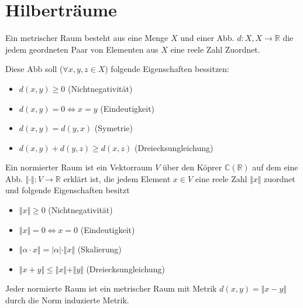 \section{Hilberträume}

\begin{Def}
	Ein metrischer Raum besteht aus eine Menge $X$ und einer Abb. $d: X,X\rightarrow \mathbb{R}$
	die jedem geordneten Paar von Elementen aus $X$ eine reele Zahl Zuordnet.

	Diese Abb soll ($\forall x,y,z \in X$) folgende Eigenschaften bessitzen:

	\begin{itemize}
		\item $d(x,y) \geq 0$ (Nichtnegativität)
		\item $d(x,y) = 0 \Leftrightarrow x = y$ (Eindeutigkeit)
		\item $d(x,y) = d(y,x)$ (Symetrie)
		\item $d(x,y) + d(y,z) \geq d(x,z)$ (Dreiecksungleichung)
	\end{itemize}
\end{Def}


\begin{Def}
	Ein normierter Raum ist ein Vektorraum $V$ über den Köprer $\mathbb{C} (\mathbb{R})$
	auf dem eine Abb. $\Vert\cdot\Vert: V \rightarrow \mathbb{R}$ erklärt ist, die jedem
	Element $x \in V$ eine reele Zahl $\Vert x \Vert$ zuordnet und folgende Eigenschaften
	besitzt
	\begin{itemize}
		\item $\Vert x \Vert \geq 0$ (Nichtnegativität)
		\item $\Vert x \Vert = 0 \Leftrightarrow x = 0$ (Eindeutigkeit)
		\item $\Vert \alpha \cdot x \Vert = \vert \alpha \vert \cdot \Vert x \Vert$ (Skalierung)
		\item $\Vert x + y\Vert \leq \Vert x \Vert + \Vert y \Vert$ (Dreiecksungleichung)
	\end{itemize}
\end{Def}

\begin{Bem}
	Jeder normierte Raum ist ein metrischer Raum mit Metrik $d(x,y) = \Vert x-y \Vert$
	durch die Norm induzierte Metrik. 
\end{Bem}

